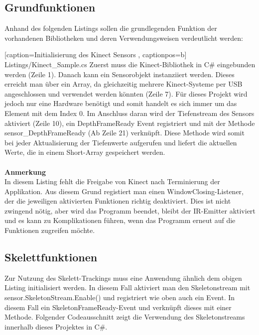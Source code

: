 %
%

\subsection{Grundfunktionen}
Anhand des folgenden Listings sollen die grundlegenden Funktion der vorhandenen Bibliotheken und deren Verwendungsweisen verdeutlicht werden:


    [caption={Initialisierung des Kinect Sensors \cite{pdf:maccormick}}
       \label{lst:kinect_sdk},
       captionpos=b]
 {Listings/Kinect_Sample.cs}
\noindent
Zuerst muss die Kinect-Bibliothek in C\# eingebunden werden (Zeile 1). Danach kann ein Sensorobjekt instanziiert werden. Dieses erreicht man über ein Array, da gleichzeitig mehrere Kinect-Systeme per USB angeschlossen und verwendet werden könnten (Zeile 7). Für dieses Projekt wird jedoch nur eine Hardware benötigt und somit handelt es sich immer um das Element mit dem Index 0. Im Anschluss daran wird der Tiefenstream des Sensors aktiviert (Zeile 10), ein \textsf{DepthFrameReady} Event registriert und mit der Methode \textsf{sensor\_DepthFrameReady} (Ab Zeile 21) verknüpft. Diese Methode wird somit bei jeder Aktualisierung der Tiefenwerte aufgerufen und liefert die aktuellen Werte, die in einem Short-Array gespeichert werden. \\ \\
\textbf{Anmerkung}\\
In diesem Listing fehlt die Freigabe von Kinect nach Terminierung der Applikation. Aus diesem Grund
registiert man einen WindowClosing-Listener, der die jeweiligen aktivierten Funktionen richtig deaktiviert. Dies ist nicht zwingend nötig, aber wird das Programm beendet, bleibt der IR-Emitter aktiviert und es kann zu Komplikationen führen, wenn das Programm erneut auf die Funktionen zugreifen möchte.

\subsection{Skelettfunktionen}
Zur Nutzung des Skelett-Trackings muss eine Anwendung ähnlich dem obigen Listing initialisiert werden.
In diesem Fall aktiviert man den Skeletonstream mit \textsf{sensor.SkeletonStream.Enable()} und registriert wie oben auch ein Event. In diesem Fall ein \textsf{SkeletonFrameReady}-Event und verknüpft dieses mit einer Methode. Folgender Codeausschnitt zeigt die Verwendung des Skeletonstreams innerhalb dieses Projektes in C\#.\\


